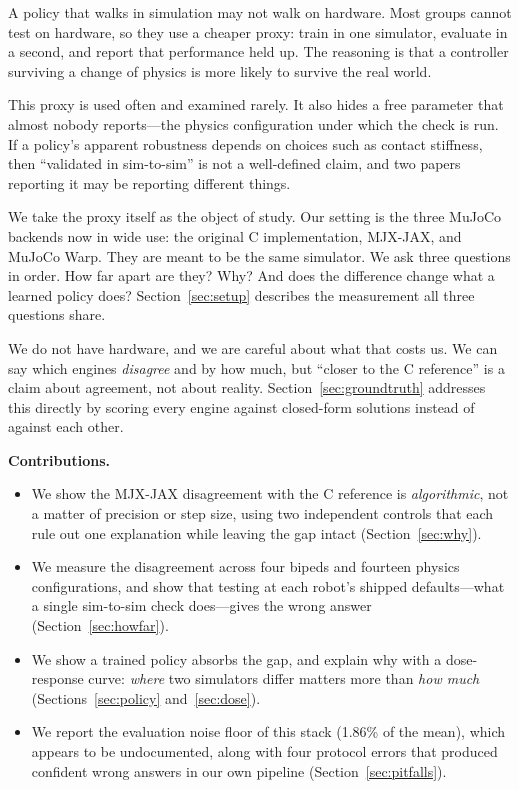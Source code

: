\documentclass[conference]{IEEEtran}
\begin{document}
A policy that walks in simulation may not walk on hardware. Most groups
cannot test on hardware, so they use a cheaper proxy: train in one
simulator, evaluate in a second, and report that performance held up.
The reasoning is that a controller surviving a change of physics is more
likely to survive the real world.

This proxy is used often and examined rarely. It also hides a free
parameter that almost nobody reports---the physics configuration under
which the check is run. If a policy's apparent robustness depends on
choices such as contact stiffness, then ``validated in sim-to-sim'' is
not a well-defined claim, and two papers reporting it may be reporting
different things.

We take the proxy itself as the object of study. Our setting is the
three MuJoCo backends now in wide use: the original C implementation,
MJX-JAX, and MuJoCo Warp. They are meant to be the same simulator. We
ask three questions in order. How far apart are they? Why? And does the
difference change what a learned policy does? Section~\ref{sec:setup}
describes the measurement all three questions share.

We do not have hardware, and we are careful about what that costs us. We
can say which engines \emph{disagree} and by how much, but ``closer to
the C reference'' is a claim about agreement, not about reality.
Section~\ref{sec:groundtruth} addresses this directly by scoring every
engine against closed-form solutions instead of against each other.

\noindent\textbf{Contributions.}
\begin{itemize}
  \item We show the MJX-JAX disagreement with the C reference is
        \emph{algorithmic}, not a matter of precision or step size, using
        two independent controls that each rule out one explanation while
        leaving the gap intact (Section~\ref{sec:why}).
  \item We measure the disagreement across four bipeds and fourteen
        physics configurations, and show that testing at each robot's
        shipped defaults---what a single sim-to-sim check does---gives the
        wrong answer (Section~\ref{sec:howfar}).
  \item We show a trained policy absorbs the gap, and explain why with a
        dose-response curve: \emph{where} two simulators differ matters
        more than \emph{how much} (Sections~\ref{sec:policy}
        and~\ref{sec:dose}).
  \item We report the evaluation noise floor of this stack (1.86\% of the
        mean), which appears to be undocumented, along with four protocol
        errors that produced confident wrong answers in our own pipeline
        (Section~\ref{sec:pitfalls}).
\end{itemize}
\end{document}
